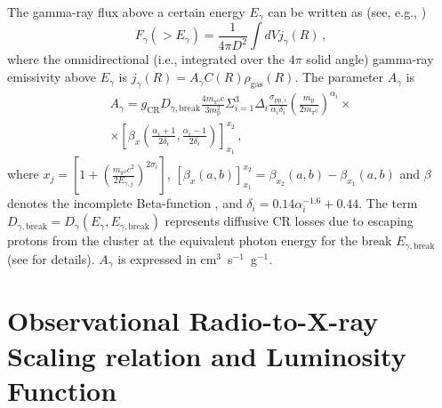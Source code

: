 \documentclass[traditabstract]{aa}
\newcommand{\rmn}{\mathrm}
\begin{document}
\begin{appendix}
The gamma-ray flux above a certain energy $E_{\gamma}$ can be written as (see, e.g., \citealp{2010MNRAS.409..449P})
%
\begin{equation}
F_{\gamma} (>E_{\gamma}) = \frac{1}{4\pi D^{2}} \int dV  j_{\gamma}(R)\, ,
\end{equation}
%
where the omnidirectional (i.e., integrated over the $4\pi$ solid angle) gamma-ray emissivity above $E_{\gamma}$ is $ j_{\gamma}(R)=A_{\gamma} C(R) \rho_{\rmn{gas}}(R)$. The parameter $A_{\gamma}$ is \citep{2010MNRAS.409..449P}
%
\begin{eqnarray}
A_{\gamma} = g_{\rmn{CR}} D_{\gamma,\rmn{break}} \frac{4 m_{\pi^{0}} c}{3 m_{\rmn{p}}^{2}} \Sigma_{i=1}^{3} \Delta_{i} \frac{\sigma_{\rmn{pp},i}}{\alpha_{i} \delta_{i}} \left( \frac{m_{\rmn{p}}}{2 m_{\pi^{0}}} \right)^{\alpha_{i}} \times \nonumber \\
\times \left[ \beta_{x} \left( \frac{\alpha_{i}+1}{2\delta_{i}}, \frac{\alpha_{i}-1}{2\delta_{i}} \right) \right]_{x_{1}}^{x_{2}} \, ,
\end{eqnarray}
%
where $x_{j}=\left[ 1 + \left( \frac{m_{\pi^{0}}c^2}{2E_{\gamma,j}} \right)^{2\sigma_{i}} \right]$, $\left[ \beta_{x}(a,b) \right]_{x_1}^{x_2} = \beta_{x_2}(a,b)-\beta_{x_1}(a,b)$ and $\beta$ denotes the incomplete Beta-function \citep{1965hmfw.book.....A}, and $\delta_{i}=0.14\alpha_{i}^{-1.6}+0.44$. The term $D_{\gamma, \rmn{break}}=D_{\gamma}(E_{\gamma},E_{\gamma,\rmn{break}})$ represents diffusive CR losses due to escaping protons from the cluster at the equivalent photon energy for the break $E_{\gamma, \rmn{break}}$ (see \citealp{2010MNRAS.409..449P} for details). $A_{\gamma}$ is expressed in cm$^3$~s$^{-1}$~g$^{-1}$. 




\section{Observational Radio-to-X-ray Scaling relation and Luminosity Function}
\label{app:D}


\end{appendix}
\end{document}
